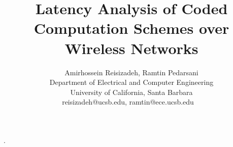 \documentclass[onecolumn,journal,twoside]{IEEEtran}
\begin{document}
\setlength{\belowcaptionskip}{-6pt}
        \setlength{\abovedisplayskip}{1mm}
        \setlength{\belowdisplayskip}{1mm}
        \setlength{\abovecaptionskip}{1mm}


{} %
{} %
{\mdseries} %
{} %
{\bfseries} %
{.} %
{ } %
{} %

\theoremstyle{newstyle}

\newtheorem{theorem}{Theorem}
\newtheorem{lemma}{Lemma}
\newtheorem{proposition}{Proposition}
\newtheorem{corollary}{Corollary}

\theoremstyle{definition}
\newtheorem{example}{Example}
\newtheorem{definition}{Definition}

\theoremstyle{remark}
\newtheorem{remark}{Remark}
\newtheorem{claim}{Claim}



\sloppy

               \setlength{\belowcaptionskip}{-6pt}
        \setlength{\abovedisplayskip}{1mm}
        \setlength{\belowdisplayskip}{1mm}
        \setlength{\abovecaptionskip}{1mm}

        \title{Latency Analysis of Coded Computation Schemes over Wireless Networks}
        \author{\vspace{4mm}\large{Amirhossein Reisizadeh, Ramtin Pedarsani}\\
                 Department of Electrical and Computer Engineering\\
                 University of California, Santa Barbara\\
                 reisizadeh@ucsb.edu, ramtin@ece.ucsb.edu~~
                }
        
\maketitle
\end{document}
